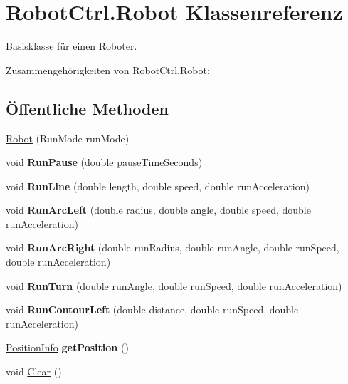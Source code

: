 \hypertarget{class_robot_ctrl_1_1_robot}{
\section{RobotCtrl.Robot Klassenreferenz}
\label{class_robot_ctrl_1_1_robot}
}


Basisklasse f\"{u}r einen Roboter.  




Zusammengehörigkeiten von RobotCtrl.Robot:\subsection*{Öffentliche Methoden}
\begin{DoxyCompactItemize}
\item 
\hyperlink{class_robot_ctrl_1_1_robot_acdd921df41328916b058eaad84ed3078}{Robot} (RunMode runMode)
\item 
\hypertarget{class_robot_ctrl_1_1_robot_a95c4c2d60e88ff9d6827d8d97eee2386}{
void {\bfseries RunPause} (double pauseTimeSeconds)}
\label{class_robot_ctrl_1_1_robot_a95c4c2d60e88ff9d6827d8d97eee2386}

\item 
\hypertarget{class_robot_ctrl_1_1_robot_a6a16f9f310f34fbe408bb7ab51a89a32}{
void {\bfseries RunLine} (double length, double speed, double runAcceleration)}
\label{class_robot_ctrl_1_1_robot_a6a16f9f310f34fbe408bb7ab51a89a32}

\item 
\hypertarget{class_robot_ctrl_1_1_robot_a07b940c45155aae3b6ae5ce7d58a90f1}{
void {\bfseries RunArcLeft} (double radius, double angle, double speed, double runAcceleration)}
\label{class_robot_ctrl_1_1_robot_a07b940c45155aae3b6ae5ce7d58a90f1}

\item 
\hypertarget{class_robot_ctrl_1_1_robot_aaff244d591788ca15722234a71cee2be}{
void {\bfseries RunArcRight} (double runRadius, double runAngle, double runSpeed, double runAcceleration)}
\label{class_robot_ctrl_1_1_robot_aaff244d591788ca15722234a71cee2be}

\item 
\hypertarget{class_robot_ctrl_1_1_robot_ae9c9a939809668a900df594a31e5bba3}{
void {\bfseries RunTurn} (double runAngle, double runSpeed, double runAcceleration)}
\label{class_robot_ctrl_1_1_robot_ae9c9a939809668a900df594a31e5bba3}

\item 
\hypertarget{class_robot_ctrl_1_1_robot_a1fe7604ec3a28152fc34659fdd1f2489}{
void {\bfseries RunContourLeft} (double distance, double runSpeed, double runAcceleration)}
\label{class_robot_ctrl_1_1_robot_a1fe7604ec3a28152fc34659fdd1f2489}

\item 
\hypertarget{class_robot_ctrl_1_1_robot_ae727424d84ab02d96e1cfb22ecc18dcd}{
\hyperlink{struct_robot_ctrl_1_1_position_info}{PositionInfo} {\bfseries getPosition} ()}
\label{class_robot_ctrl_1_1_robot_ae727424d84ab02d96e1cfb22ecc18dcd}

\item 
void \hyperlink{class_robot_ctrl_1_1_robot_afb01a74bfcb74eab60f041a368f93737}{Clear} ()
\end{DoxyCompactItemize}
